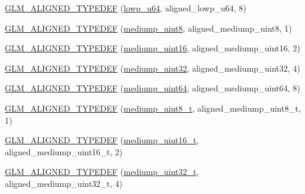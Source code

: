 \begin{DoxyCompactItemize}
\item 
\hyperlink{group__gtx__type__aligned_gacca5f13627f57b3505676e40a6e43e5e}{G\+L\+M\+\_\+\+A\+L\+I\+G\+N\+E\+D\+\_\+\+T\+Y\+P\+E\+D\+E\+F} (\hyperlink{group__gtc__type__precision_ga61ed4c68a4cffb77cd63cc107119123a}{lowp\+\_\+u64}, aligned\+\_\+lowp\+\_\+u64, 8)
\item 
\hyperlink{group__gtx__type__aligned_ga5faf1d3e70bf33174dd7f3d01d5b883b}{G\+L\+M\+\_\+\+A\+L\+I\+G\+N\+E\+D\+\_\+\+T\+Y\+P\+E\+D\+E\+F} (\hyperlink{group__gtc__type__precision_gac4b849eaac0543a10f97f4bdda4850a8}{mediump\+\_\+uint8}, aligned\+\_\+mediump\+\_\+uint8, 1)
\item 
\hyperlink{group__gtx__type__aligned_ga727e2bf2c433bb3b0182605860a48363}{G\+L\+M\+\_\+\+A\+L\+I\+G\+N\+E\+D\+\_\+\+T\+Y\+P\+E\+D\+E\+F} (\hyperlink{group__gtc__type__precision_ga2cef3a0d7b0fce75c9885f64656d8933}{mediump\+\_\+uint16}, aligned\+\_\+mediump\+\_\+uint16, 2)
\item 
\hyperlink{group__gtx__type__aligned_ga12566ca66d5962dadb4a5eb4c74e891e}{G\+L\+M\+\_\+\+A\+L\+I\+G\+N\+E\+D\+\_\+\+T\+Y\+P\+E\+D\+E\+F} (\hyperlink{group__gtc__type__precision_ga861dbd1051f488e425b3966001b568e5}{mediump\+\_\+uint32}, aligned\+\_\+mediump\+\_\+uint32, 4)
\item 
\hyperlink{group__gtx__type__aligned_ga7b66a97a8acaa35c5a377b947318c6bc}{G\+L\+M\+\_\+\+A\+L\+I\+G\+N\+E\+D\+\_\+\+T\+Y\+P\+E\+D\+E\+F} (\hyperlink{group__gtc__type__precision_ga6685788d15d0a973ee7c2460d0456dc1}{mediump\+\_\+uint64}, aligned\+\_\+mediump\+\_\+uint64, 8)
\item 
\hyperlink{group__gtx__type__aligned_gaa9cde002439b74fa66120a16a9f55fcc}{G\+L\+M\+\_\+\+A\+L\+I\+G\+N\+E\+D\+\_\+\+T\+Y\+P\+E\+D\+E\+F} (\hyperlink{group__gtc__type__precision_gadfa38f3c245d371c4b2079f1fd68928b}{mediump\+\_\+uint8\+\_\+t}, aligned\+\_\+mediump\+\_\+uint8\+\_\+t, 1)
\item 
\hyperlink{group__gtx__type__aligned_ga1ca98c67f7d1e975f7c5202f1da1df1f}{G\+L\+M\+\_\+\+A\+L\+I\+G\+N\+E\+D\+\_\+\+T\+Y\+P\+E\+D\+E\+F} (\hyperlink{group__gtc__type__precision_ga0b385466deac5ac96061ef2cdd6db20f}{mediump\+\_\+uint16\+\_\+t}, aligned\+\_\+mediump\+\_\+uint16\+\_\+t, 2)
\item 
\hyperlink{group__gtx__type__aligned_ga1dc8bc6199d785f235576948d80a597c}{G\+L\+M\+\_\+\+A\+L\+I\+G\+N\+E\+D\+\_\+\+T\+Y\+P\+E\+D\+E\+F} (\hyperlink{group__gtc__type__precision_gac7782c1e393f9ad47e41a177a685f287}{mediump\+\_\+uint32\+\_\+t}, aligned\+\_\+mediump\+\_\+uint32\+\_\+t, 4)
\item 

\end{DoxyCompactItemize}
